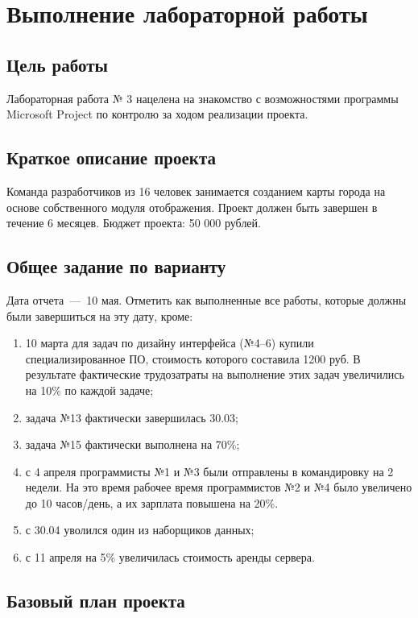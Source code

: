 \chapter{Выполнение лабораторной работы}

\section{Цель работы}

Лабораторная работа № 3 нацелена на знакомство с возможностями программы Microsoft Project по контролю за ходом реализации проекта.


\section{Краткое описание проекта}

Команда разработчиков из 16 человек занимается созданием карты города на основе собственного модуля отображения. Проект должен быть завершен в течение 6 месяцев. Бюджет проекта: 50 000 рублей.

\section{Общее задание по варианту}

Дата отчета~---~10 мая. Отметить как выполненные все работы, которые должны были завершиться на эту дату, кроме:
\begin{enumerate}
	\item 10 марта для задач по дизайну интерфейса (№4--6) купили специализированное ПО, стоимость которого составила 1200 руб. В результате фактические трудозатраты на выполнение этих задач увеличились на 10\% по каждой задаче;
	\item задача №13 фактически завершилась 30.03;
	\item задача №15 фактически выполнена на 70\%;
	\item с 4 апреля программисты №1 и №3 были отправлены в командировку на 2 недели. На это время рабочее время программистов №2 и №4 было увеличено до 10 часов/день, а их зарплата повышена на 20\%.
	\item с 30.04 уволился один из наборщиков данных;
	\item с 11 апреля на 5\% увеличилась стоимость аренды сервера.
\end{enumerate}

\section{Базовый план проекта}

